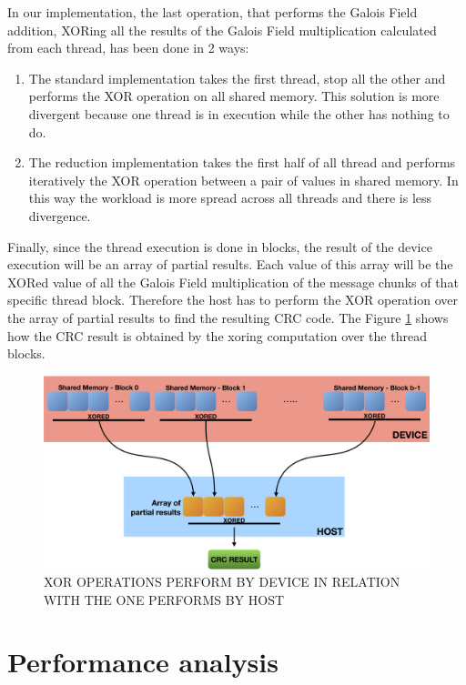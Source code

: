 \documentclass[fleqn]{IEEEtran}
\begin{document}
In our implementation, the last operation, that performs the Galois Field addition, XORing all the 
results of the Galois Field multiplication calculated from each thread, has been done in 2 ways:
\begin{enumerate}
   \item The standard implementation takes the first thread, stop all the 
   other and performs the XOR operation on all shared memory. This solution 
   is more divergent because one thread is in execution while the 
   other has nothing to do.
   \item The reduction implementation takes the first half of all thread and 
   performs iteratively the XOR operation between a pair of values in shared 
   memory. In this way the workload is more spread across all threads and 
   there is less divergence.
\end{enumerate}

Finally, since the thread execution is done in blocks, the result of the 
device execution will be an array of partial results. Each value of this 
array will be the XORed value of all the Galois Field 
multiplication of the message chunks of that specific thread block. 
Therefore the host has to perform the XOR operation over the array of partial 
results to find the resulting CRC code. The Figure \ref{fig:PCRC-reduction} 
shows how the CRC result is obtained by the xoring computation over 
the thread blocks.

\begin{figure}[bt]
\centering
\includegraphics[width=\columnwidth]{figures/PCRC-reduction.png}
\caption{XOR OPERATIONS PERFORM BY DEVICE IN RELATION WITH THE ONE PERFORMS BY HOST}
\label{fig:PCRC-reduction}
\end{figure}


\section{Performance analysis}
\end{document}
